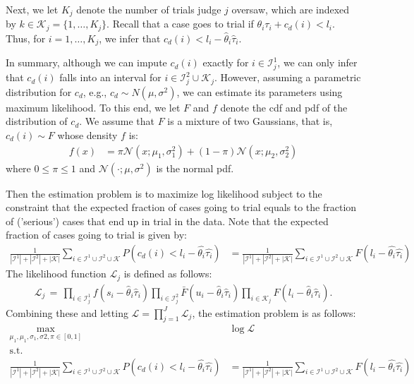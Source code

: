 \documentclass[11pt, oneside]{article}   	%
\theoremstyle{ModifiedStyle}
\begin{document}
		Next, we let $K_j$ denote the number of trials judge $j$ oversaw, which are indexed by $k \in \mathcal{K}_j = \{1,\ldots,K_j\}$. Recall that a case goes to trial if $\theta_i\tau_i+c_d(i)<l_i$. Thus, for $i=1,\ldots,K_j$, we infer that $c_d(i) < l_i-\hat{\theta}_i\hat{\tau}_i$.

		In summary, although we can impute $c_d(i)$ exactly for $i\in\mathcal{I}_j^1$, we can only infer that $c_d(i)$ falls into an interval for $i\in\mathcal{I}^2_j\cup \mathcal{K}_j$. However, assuming a parametric distribution for $c_d$, e.g., $c_d \sim N(\mu,\sigma^2)$, we can estimate its parameters using maximum likelihood. To this end, we let $F$ and $f$ denote the cdf and pdf of the distribution of $c_d$. We assume that $F$ is a mixture of two Gaussians, that is, $c_d(i) \sim F$ whose density $f$ is:
		\begin{align*}
			f(x) &= \pi \mathcal{N}(x;\mu_1,\sigma_1^2) + (1-\pi)\mathcal{N}(x;\mu_2,\sigma_2^2)
		\end{align*}
		where $0 \leq \pi \leq 1$ and $\mathcal{N}(\cdot;\mu,\sigma^2)$ is the normal pdf.

		Then the estimation problem is to maximize log likelihood subject to the constraint that the expected fraction of cases going to trial equals to the fraction of ('serious') cases that end up in trial in the data. Note that the expected fraction of cases going to trial is given by:
		\begin{align*}
			\frac{1}{|\mathcal{I}^1| + |\mathcal{I}^2| + |\mathcal{K}|} \sum_{i \in \mathcal{I}^1 \cup \mathcal{I}^2 \cup \mathcal{K}} P(c_d(i) < l_i - \hat{\theta_i} \hat{\tau_i}) &= \frac{1}{|\mathcal{I}^1| + |\mathcal{I}^2| + |\mathcal{K}|} \sum_{i \in \mathcal{I}^1 \cup \mathcal{I}^2 \cup \mathcal{K}} F(l_i - \hat{\theta_i} \hat{\tau_i})
		\end{align*}
		 The likelihood function $\mathscr{L}_j$ is defined as follows:
		\begin{align*}
			\mathscr{L}_j \,=\, \prod_{i\in\mathcal{I}_j^1} f(s_i-\hat{\theta}_i\hat{\tau}_i) \prod_{i\in\mathcal{I}_j^2} \bar{F}(u_i-\hat{\theta}_i\hat{\tau}_i) \prod_{i\in \mathcal{K}_j} F(l_i-\hat{\theta}_i\hat{\tau}_i).
		\end{align*}
		Combining these and letting $\mathscr{L} = \prod_{j=1}^J \mathscr{L}_j$, the estimation problem is as follows:
		\begin{align*}
			\max_{\mu_1,\mu_1,\sigma_1,\sigma2,\pi \in [0,1]} & \log \mathcal{L}\\
			\text{s.t.           }\\
			\frac{1}{|\mathcal{I}^1| + |\mathcal{I}^2| + |\mathcal{K}|} \sum_{i \in \mathcal{I}^1 \cup \mathcal{I}^2 \cup \mathcal{K}} P(c_d(i) < l_i - \hat{\theta_i} \hat{\tau_i}) &= \frac{1}{|\mathcal{I}^1| + |\mathcal{I}^2| + |\mathcal{K}|} \sum_{i \in \mathcal{I}^1 \cup \mathcal{I}^2 \cup \mathcal{K}} F(l_i - \hat{\theta_i} \hat{\tau_i})
		\end{align*}
\end{document}
